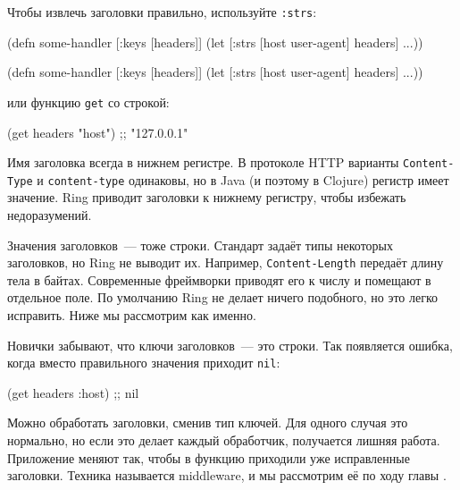 Чтобы извлечь заголовки правильно, используйте \verb|:strs|:

\ifnarrow

\begin{english}
  \begin{clojure}
(defn some-handler
  [{:keys [headers]}]
  (let [{:strs [host
                user-agent]} headers]
    ...))
  \end{clojure}
\end{english}

\else

\begin{english}
  \begin{clojure}
(defn some-handler
  [{:keys [headers]}]
  (let [{:strs [host user-agent]} headers]
    ...))
  \end{clojure}
\end{english}

\fi

\noindent
или функцию \verb|get| со строкой:

\begin{english}
  \begin{clojure}
(get headers "host") ;; "127.0.0.1"
  \end{clojure}
\end{english}


Имя заголовка всегда в нижнем регистре. В протоколе HTTP варианты
\verb|Content-Type| и \verb|content-type| одинаковы, но в Java (и поэтому в
Clojure) регистр имеет значение. Ring приводит заголовки к нижнему регистру,
чтобы избежать недоразумений.

Значения заголовков~--- тоже строки. Стандарт задаёт типы некоторых заголовков,
но Ring не выводит их. Например, \verb|Content-Length| передаёт длину тела в
байтах. Современные фреймворки приводят его к числу и помещают в отдельное
поле. По умолчанию Ring не делает ничего подобного, но это легко исправить. Ниже
мы рассмотрим как именно.

Новички забывают, что ключи заголовков~--- это строки. Так появляется ошибка, когда
вместо правильного значения приходит \verb|nil|:

\begin{english}
  \begin{clojure}
(get headers :host) ;; nil
  \end{clojure}
\end{english}

Можно обработать заголовки, сменив тип ключей. Для одного случая это нормально,
но если это делает каждый обработчик, получается лишняя работа. Приложение
меняют так, чтобы в функцию приходили уже исправленные заголовки. Техника
называется middleware, и мы рассмотрим её по ходу главы .

